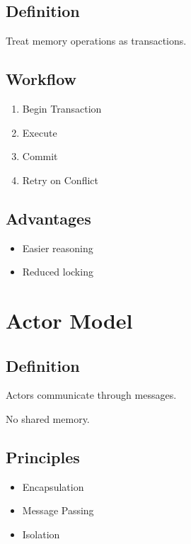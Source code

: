\subsection{Definition}

Treat memory operations as transactions.

\subsection{Workflow}

\begin{enumerate}
\item Begin Transaction
\item Execute
\item Commit
\item Retry on Conflict
\end{enumerate}

\subsection{Advantages}

\begin{itemize}
\item Easier reasoning
\item Reduced locking
\end{itemize}

\section{Actor Model}

\subsection{Definition}

Actors communicate through messages.

No shared memory.

\subsection{Principles}

\begin{itemize}
\item Encapsulation
\item Message Passing
\item Isolation
\end{itemize}

